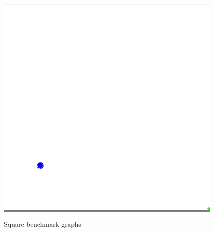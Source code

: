 \documentclass{article}
\begin{document}
\begin{figure}
\begin{minipage}{0.3\textwidth}
    \end{minipage}
    \vskip 0.1in
    \begin{minipage}{0.3\textwidth}
    \colorbox{gray}{\includegraphics[width=\linewidth]{./images/square_6.png}}
    \end{minipage}
    \hspace{\fill}

    \caption{Square benchmark graphs}
    \label{squares}
\end{figure}

\end{document}
